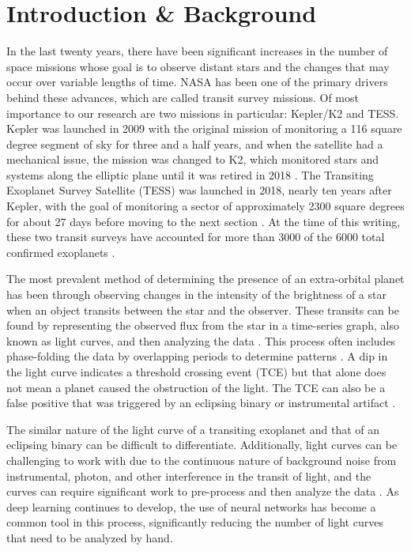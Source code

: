 \documentclass[letterpaper]{article} %
\begin{document}
\section*{Introduction \& Background}
In the last twenty years, there have been significant increases in the number of space missions whose goal is to observe distant stars and the changes that may occur over variable lengths of time. NASA has been one of the primary drivers behind these advances, which are called transit survey missions. Of most importance to our research are two missions in particular: Kepler/K2 and TESS. Kepler was launched in 2009 with the original mission of monitoring a 116 square degree segment of sky for three and a half years, and when the satellite had a mechanical issue, the mission was changed to K2, which monitored stars and systems along the elliptic plane until it was retired in 2018 \cite{salinas2023distinguishingtransitfalsepositives}. The Transiting Exoplanet Survey Satellite (TESS) was launched in 2018, nearly ten years after Kepler, with the goal of monitoring a sector of approximately 2300 square degrees for about 27 days before moving to the next section \cite{salinas2023distinguishingtransitfalsepositives}. At the time of this writing, these two transit surveys have accounted for more than 3000 of the 6000 total confirmed exoplanets \cite{salinas2025tessfullframe}. 

The most prevalent method of determining the presence of an extra-orbital planet has been through observing changes in the intensity of the brightness of a star when an object transits between the star and the observer. These transits can be found by representing the observed flux from the star in a time-series graph, also known as light curves, and then analyzing the data \cite{morvan2022dontpayattentionnoise}. This process often includes phase-folding the data by overlapping periods to determine patterns \cite{salinas2023distinguishingtransitfalsepositives}. A dip in the light curve indicates a threshold crossing event (TCE) but that alone does not mean a planet caused the obstruction of the light. The TCE can also be a false positive that was triggered by an eclipsing binary or instrumental artifact \cite{salinas2025tessfullframe}. 

The similar nature of the light curve of a transiting exoplanet and that of an eclipsing binary can be difficult to differentiate. Additionally, light curves can be challenging to work with due to the continuous nature of background noise from instrumental, photon, and other interference in the transit of light, and the curves can require significant work to pre-process and then analyze the data \cite{morvan2022dontpayattentionnoise}. As deep learning continues to develop, the use of neural networks has become a common tool in this process, significantly reducing the number of light curves that need to be analyzed by hand.
\end{document}
